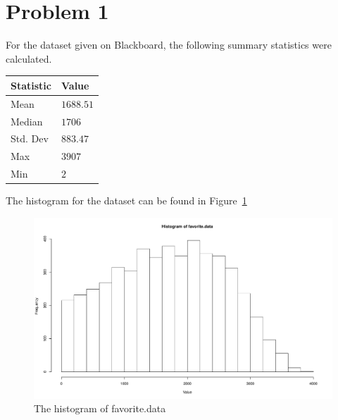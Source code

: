 \documentclass{amsart}
\begin{document}
\section{Problem 1}
For the dataset given on Blackboard, the following summary statistics were calculated.

\begin{table}[ht]
\centering
\begin{tabular}{ll}
  \hline
Statistic & Value \\
  \hline
Mean & $1688.51$ \\
Median & $1706$ \\
Std. Dev & $883.47$ \\
Max & $3907$ \\
Min & $2$ \\
   \hline
\end{tabular}
\end{table}

The histogram for the dataset can be found in Figure~\ref{fig:p1a}

\begin{figure}
  \centering
  \includegraphics[width=\linewidth]{problem1_histogram.pdf}
  \caption{The histogram of favorite.data}
  \label{fig:p1a}
\end{figure}
\end{document}
